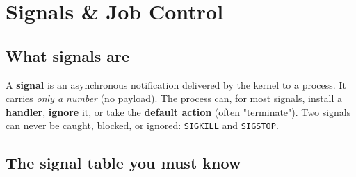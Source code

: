 \documentclass[11pt]{article}
\begin{document}
\section{Signals \& Job Control}\label{signals--job-control}

\subsection{What signals are}\label{what-signals-are}

A \textbf{signal} is an asynchronous notification delivered by the kernel to a process. It carries \emph{only a number} (no payload). The process can, for most signals, install a \textbf{handler}, \textbf{ignore} it, or take the \textbf{default action} (often "terminate"). Two signals can never be caught, blocked, or ignored: \texttt{SIGKILL} and \texttt{SIGSTOP}.

\subsection{The signal table you must know}\label{the-signal-table-you-must-know}
\end{document}
